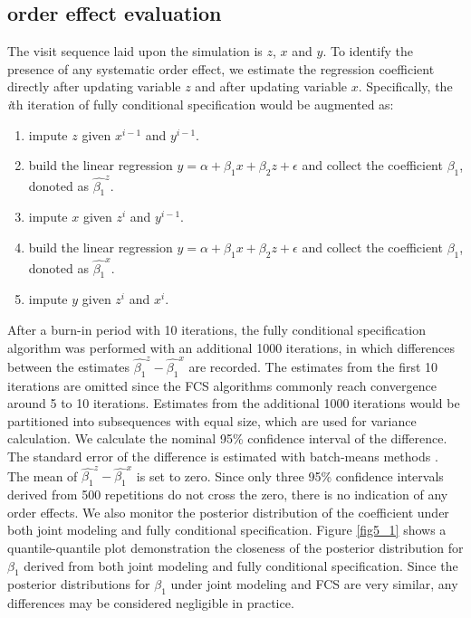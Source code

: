 	\subsection{order effect evaluation}
	The visit sequence laid upon the simulation is $z$, $x$ and $y$. To identify the presence of any systematic order effect, we estimate the regression coefficient directly after updating variable $z$ and after updating variable $x$. Specifically, the \emph{i}th iteration of fully conditional specification would be augmented as:
	\begin{enumerate}
		\item impute $z$ given $x^{i-1}$ and $y^{i-1}$.
		\item build the linear regression $y = \alpha + \beta_{1}x + \beta_{2}z + \epsilon$ and collect the coefficient $\beta_{1}$, donoted as $\hat{\beta_{1}}^z$.
		\item impute $x$ given $z^{i}$ and $y^{i-1}$.
		\item build the linear regression $y = \alpha + \beta_{1}x + \beta_{2}z + \epsilon$ and collect the coefficient $\beta_{1}$, donoted as $\hat{\beta_{1}}^x$.
		\item impute $y$ given $z^{i}$ and $x^{i}$.	 
	\end{enumerate}
	After a burn-in period with 10 iterations, the fully conditional specification algorithm was performed with an additional 1000 iterations, in which differences between the estimates $\hat{\beta_{1}}^z - \hat{\beta_{1}}^x$ are recorded. The estimates from the first 10 iterations are omitted since the FCS algorithms commonly reach convergence around 5 to 10 iterations. Estimates from the additional 1000 iterations would be partitioned into subsequences with equal size, which are used for variance calculation. We calculate the nominal 95\% confidence interval of the difference. The standard error of the difference is estimated with batch-means methods \citep[p. 124]{albert2009bayesian}. The mean of $\hat{\beta_{1}}^z - \hat{\beta_{1}}^x$ is set to zero. Since only three 95\% confidence intervals derived from 500 repetitions do not cross the zero, there is no indication of any order effects. We also monitor the posterior distribution of the coefficient under both joint modeling and fully conditional specification. Figure \ref{fig5_1} shows a quantile-quantile plot demonstration the closeness of the posterior distribution for $\beta_{1}$ derived from both joint modeling and fully conditional specification. Since the posterior distributions for $\beta_{1}$ under joint modeling and FCS are very similar, any differences may be considered negligible in practice.  
